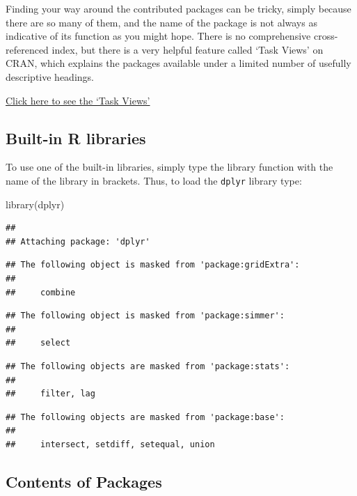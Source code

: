 \documentclass[
]{book}
\newenvironment{Shaded}{\begin{snugshade}}{\end{snugshade}}
\newcommand{\FunctionTok}[1]{\textcolor[rgb]{0.00,0.00,0.00}{#1}}
\newcommand{\NormalTok}[1]{#1}
\begin{document}
Finding your way around the contributed packages can be tricky, simply because there are so many of them, and the name of the package is not always as indicative of its function as you might hope. There is no comprehensive cross-referenced index, but there is a very helpful feature called `Task Views' on CRAN, which explains the packages available under a limited number of usefully descriptive headings.

\href{https://cran.r-project.org/}{Click here to see the `Task Views'}

\hypertarget{built-in-r-libraries}{%
\subsection{Built-in R libraries}\label{built-in-r-libraries}}

To use one of the built-in libraries, simply type the library function with the name of the library in brackets. Thus, to load the \texttt{dplyr} library type:

\begin{Shaded}
\begin{Highlighting}[]
\FunctionTok{library}\NormalTok{(dplyr)}
\end{Highlighting}
\end{Shaded}

\begin{verbatim}
## 
## Attaching package: 'dplyr'
\end{verbatim}

\begin{verbatim}
## The following object is masked from 'package:gridExtra':
## 
##     combine
\end{verbatim}

\begin{verbatim}
## The following object is masked from 'package:simmer':
## 
##     select
\end{verbatim}

\begin{verbatim}
## The following objects are masked from 'package:stats':
## 
##     filter, lag
\end{verbatim}

\begin{verbatim}
## The following objects are masked from 'package:base':
## 
##     intersect, setdiff, setequal, union
\end{verbatim}

\hypertarget{contents-of-packages}{%
\subsection{Contents of Packages}\label{contents-of-packages}}
\end{document}
